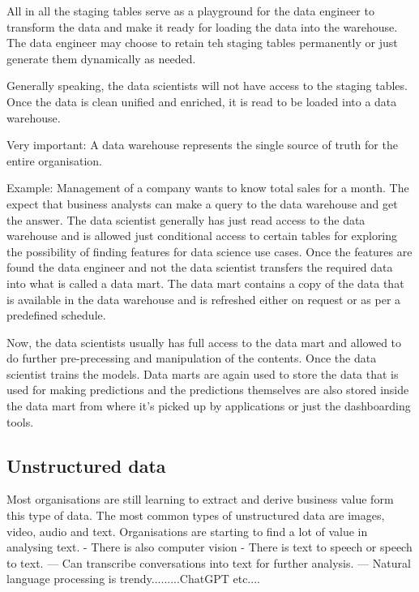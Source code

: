 \documentclass[11pt]{article}
\begin{document}
    All in all the staging tables serve as a playground for the data engineer to transform the data and make it ready for loading the data into the warehouse.
    The data engineer may choose to retain teh staging tables permanently or just generate them dynamically as needed.

    Generally speaking, the data scientists will not have access to the staging tables.
    Once the data is clean unified and enriched, it is read to be loaded into a data warehouse.

    Very important: A data warehouse represents the single source of truth for the entire organisation.

    Example:
    Management of a company wants to know total sales for a month. The expect that business analysts can make a query to the data warehouse and get the answer.
    The data scientist generally has just read access to the data warehouse and is allowed just conditional access to certain tables for exploring the possibility of finding features for data science use cases.
    Once the features are found the data engineer and not the data scientist transfers the required data into what is called a data mart.
    The data mart contains a copy of the data that is available in the data warehouse and is refreshed either on request or as per a predefined schedule.

    Now, the data scientists usually has full access to the data mart and allowed to do further pre-precessing and manipulation of the contents.
    Once the data scientist trains the models.
    Data marts are again used to store the data that is used for making predictions and the predictions themselves are also stored inside the data mart from where it's picked up by applications or just the dashboarding tools.

    \subsection{Unstructured data}
    Most organisations are still learning to extract and derive business value form this type of data.
    The most common types of unstructured data are images, video, audio and text.
    Organisations are starting to find a lot of value in analysing text.
    - There is also computer vision
    - There is text to speech or speech to text.
    --- Can transcribe conversations into text for further analysis.
    --- Natural language processing is trendy.........ChatGPT etc....
\end{document}
